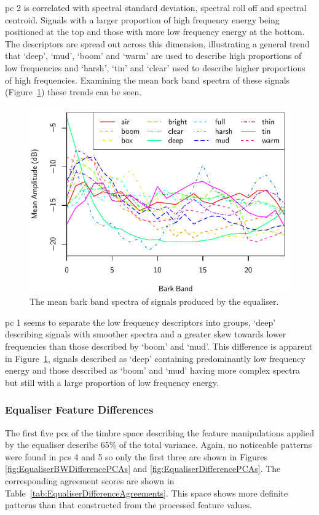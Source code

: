 			\acrshort{pc} 2 is correlated with spectral standard deviation, spectral roll off and spectral
			centroid.  Signals with a larger proportion of high frequency energy being positioned at the top
			and those with more low frequency energy at the bottom. The descriptors are spread out across this
			dimension, illustrating a general trend that `deep', `mud', `boom' and `warm' are used to describe
			high proportions of low frequencies and `harsh', `tin' and `clear' used to describe higher
			proportions of high frequencies. Examining the mean bark band spectra of these signals
			(Figure~\ref{fig:EqualiserProcessedSpectra}) these trends can be seen. 

			\begin{figure}[h!]
				\centering
				\includegraphics{chapter4/Images/EqualiserProcessedSpectra.pdf}
				\caption{The mean bark band spectra of signals produced by the equaliser.}
				\label{fig:EqualiserProcessedSpectra}
			\end{figure}

			\acrshort{pc} 1 seems to separate the low frequency descriptors into groups, `deep' describing
			signals with smoother spectra and a greater skew towards lower frequencies than those described by
			`boom' and `mud'. This difference is apparent in Figure~\ref{fig:EqualiserProcessedSpectra},
			signals described as `deep' containing predominantly low frequency energy and those described as
			`boom' and `mud' having more complex spectra but still with a large proportion of low frequency
			energy.

		\subsubsection*{Equaliser Feature Differences}
			The first five \acrshort{pc}s of the timbre space describing the feature manipulations applied by
			the equaliser describe 65\% of the total variance. Again, no noticeable patterns were found in
			\acrshort{pc}s 4 and 5 so only the first three are shown in Figures
			\ref{fig:EqualiserBWDifferencePCAs} and \ref{fig:EqualiserDifferencePCAs}. The corresponding
			agreement scores are shown in Table~\ref{tab:EqualiserDifferenceAgreements}. This space shows more
			definite patterns than that constructed from the processed feature values.

